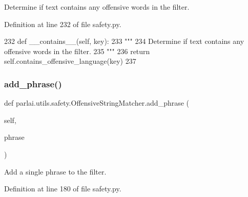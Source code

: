 \begin{DoxyVerb}Determine if text contains any offensive words in the filter.
\end{DoxyVerb}
 

Definition at line 232 of file safety.\+py.


\begin{DoxyCode}
232     \textcolor{keyword}{def }\_\_contains\_\_(self, key):
233         \textcolor{stringliteral}{"""}
234 \textcolor{stringliteral}{        Determine if text contains any offensive words in the filter.}
235 \textcolor{stringliteral}{        """}
236         \textcolor{keywordflow}{return} self.contains\_offensive\_language(key)
237 \end{DoxyCode}
\mbox{\label{classparlai_1_1utils_1_1safety_1_1OffensiveStringMatcher_a9272830360cad4f382c2350dd39b3e6e}} 
\subsubsection{\texorpdfstring{add\+\_\+phrase()}{add\_phrase()}}
{\footnotesize\ttfamily def parlai.\+utils.\+safety.\+Offensive\+String\+Matcher.\+add\+\_\+phrase (\begin{DoxyParamCaption}\item[{}]{self,  }\item[{}]{phrase }\end{DoxyParamCaption})}

\begin{DoxyVerb}Add a single phrase to the filter.
\end{DoxyVerb}
 

Definition at line 180 of file safety.\+py.


